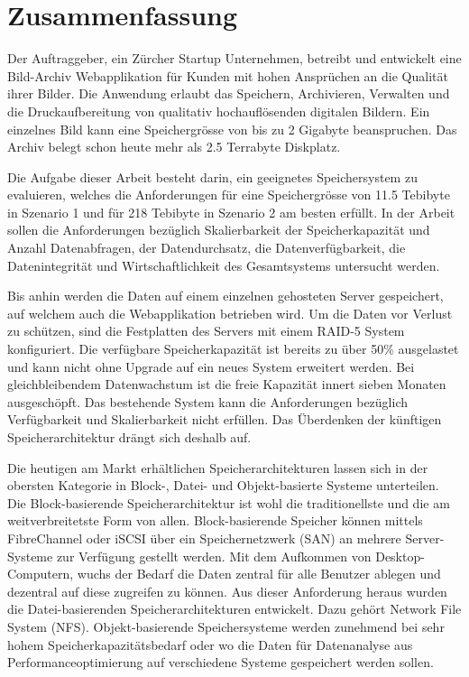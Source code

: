 \cleardoublepage
\chapter{Zusammenfassung}

Der Auftraggeber, ein Zürcher Startup Unternehmen, betreibt und entwickelt eine Bild-Archiv Webapplikation für Kunden mit hohen Ansprüchen an die Qualität ihrer Bilder. Die Anwendung erlaubt das Speichern, Archivieren, Verwalten und die Druckaufbereitung von qualitativ hochauflösenden digitalen Bildern. Ein einzelnes Bild kann eine Speichergrösse von bis zu 2 Gigabyte beanspruchen. Das Archiv belegt schon heute mehr als 2.5 Terrabyte Diskplatz.

Die Aufgabe dieser Arbeit besteht darin, ein geeignetes Speichersystem zu evaluieren, welches die Anforderungen für eine Speichergrösse von 11.5 Tebibyte in Szenario 1 und für 218 Tebibyte in Szenario 2 am besten erfüllt. In der Arbeit sollen die Anforderungen bezüglich Skalierbarkeit der Speicherkapazität und Anzahl Datenabfragen, der Datendurchsatz, die Datenverfügbarkeit, die Datenintegrität und Wirtschaftlichkeit des Gesamtsystems untersucht werden.

Bis anhin werden die Daten auf einem einzelnen gehosteten Server gespeichert, auf welchem auch die Webapplikation betrieben wird. Um die Daten vor Verlust zu schützen, sind die Festplatten des Servers mit einem RAID-5 System konfiguriert. Die verfügbare Speicherkapazität ist bereits zu über 50\% ausgelastet und kann nicht ohne Upgrade auf ein neues System erweitert werden. Bei gleichbleibendem Datenwachstum ist die freie Kapazität innert sieben Monaten ausgeschöpft. Das bestehende System kann die Anforderungen bezüglich Verfügbarkeit und Skalierbarkeit nicht erfüllen. Das Überdenken der künftigen Speicherarchitektur drängt sich deshalb auf.
 
Die heutigen am Markt erhältlichen Speicherarchitekturen lassen sich in der obersten Kategorie in Block-, Datei- und Objekt-basierte Systeme unterteilen. Die Block-basierende Speicherarchitektur ist wohl die traditionellste und die am weitverbreitetste Form von allen. Block-basierende Speicher können mittels FibreChannel oder iSCSI über ein Speichernetzwerk (SAN) an mehrere Server-Systeme zur Verfügung gestellt werden. Mit dem Aufkommen von Desktop-Computern, wuchs der Bedarf die Daten zentral für alle Benutzer ablegen und dezentral auf diese zugreifen zu können. Aus dieser Anforderung heraus wurden die Datei-basierenden Speicherarchitekturen entwickelt. Dazu gehört Network File System (NFS). Objekt-basierende Speichersysteme werden zunehmend bei sehr hohem Speicherkapazitätsbedarf oder wo die Daten für Datenanalyse aus Performanceoptimierung auf verschiedene Systeme gespeichert werden sollen.

